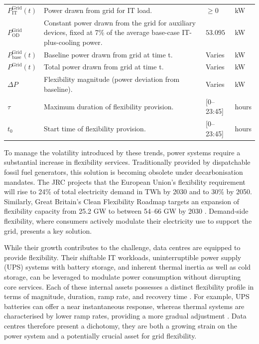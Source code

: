 \documentclass[lettersize,journal]{IEEEtran}
\newcommand{\rev}[1]{\textcolor{blue!70!black}{#1}}
\begin{document}
{{\begin{longtable}{p{} p{} p{} p{}}
$P^{\mathrm{Grid}}_{\mathrm{IT}}(t)$ & Power drawn from grid for IT load. & $\geq 0$ &kW \\
$P^{\mathrm{Grid}}_{\mathrm{OD}}$ & \rev{Constant power drawn from the grid for auxiliary devices, fixed at 7\% of the average base-case IT-plus-cooling power.} & $53.095$ &kW \\
$P^{\mathrm{Grid}}_{\mathrm{base}}(t)$ & Baseline power drawn from grid at time t. & Varies &kW \\
$P^{\mathrm{Grid}}(t)$ & Total power drawn from grid at time t. & Varies &kW \\
$\Delta P$ & Flexibility magnitude (power deviation from baseline). & Varies &kW \\
$\tau$ & Maximum duration of flexibility provision. & [0–23:45] & hours \\
$t_0$ & Start time of flexibility provision. & [0–23:45] & hours \\
\end{longtable}
\twocolumn
}
} %
To manage the volatility introduced by these trends, power systems require a substantial increase in flexibility services. Traditionally provided by dispatchable fossil fuel generators, this solution is becoming obsolete under decarbonisation mandates. The JRC \cite{koolen2023flexibility} projects that the European Union’s flexibility requirement will rise to 24\% of total electricity demand in TWh by 2030 and to 30\% by 2050. Similarly, Great Britain’s Clean Flexibility Roadmap targets an expansion of flexibility capacity from 25.2 GW to between 54–66 GW by 2030 \cite{clean_flexibility_roadmap}. Demand-side flexibility, where consumers actively modulate their electricity use to support the grid, presents a key solution.

While their growth contributes to the challenge, data centres are equipped to provide flexibility. Their shiftable IT workloads, uninterruptible power supply (UPS) systems with battery storage, and inherent thermal inertia as well as cold storage, can be leveraged to modulate power consumption without disrupting core services. Each of these internal assets possesses a distinct flexibility profile in terms of magnitude, duration, ramp rate, and recovery time \cite{zhang2025unlocking}. For example, UPS batteries can offer a near instantaneous response, whereas thermal systems are characterised by lower ramp rates, providing a more gradual adjustment \cite{zhang2025unlocking, alapera2018data}. Data centres therefore present a dichotomy, they are both a growing strain on the power system and a potentially crucial asset for grid flexibility.
\end{document}
